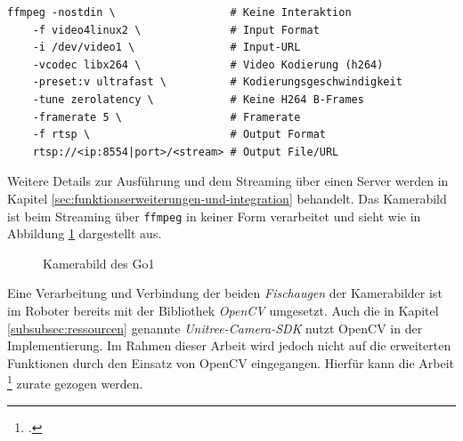 \begin{lstlisting}
ffmpeg -nostdin \                  # Keine Interaktion
    -f video4linux2 \              # Input Format
    -i /dev/video1 \               # Input-URL
    -vcodec libx264 \              # Video Kodierung (h264)
    -preset:v ultrafast \          # Kodierungsgeschwindigkeit
    -tune zerolatency \            # Keine H264 B-Frames
    -framerate 5 \                 # Framerate
    -f rtsp \                      # Output Format
    rtsp://<ip:8554|port>/<stream> # Output File/URL
\end{lstlisting}

\noindent Weitere Details zur Ausführung und dem Streaming über einen Server werden in Kapitel \ref{sec:funktionserweiterungen-und-integration}
behandelt.
Das Kamerabild ist beim Streaming über \texttt{ffmpeg} in keiner Form verarbeitet und sieht wie in Abbildung \ref{fig:kamera-bild}
dargestellt aus.

\begin{figure}[h]
    \caption{Kamerabild des Go1}\label{fig:kamera-bild}
\end{figure}

Eine Verarbeitung und Verbindung der beiden \emph{Fischaugen} der Kamerabilder ist im Roboter bereits mit der Bibliothek \emph{OpenCV}
umgesetzt.
Auch die in Kapitel \ref{subsubsec:ressourcen} genannte \emph{Unitree-Camera-SDK} nutzt OpenCV in der Implementierung.
Im Rahmen dieser Arbeit wird jedoch nicht auf die erweiterten Funktionen durch den Einsatz von OpenCV eingegangen.
Hierfür kann die Arbeit \footcite{jonas} zurate gezogen werden.